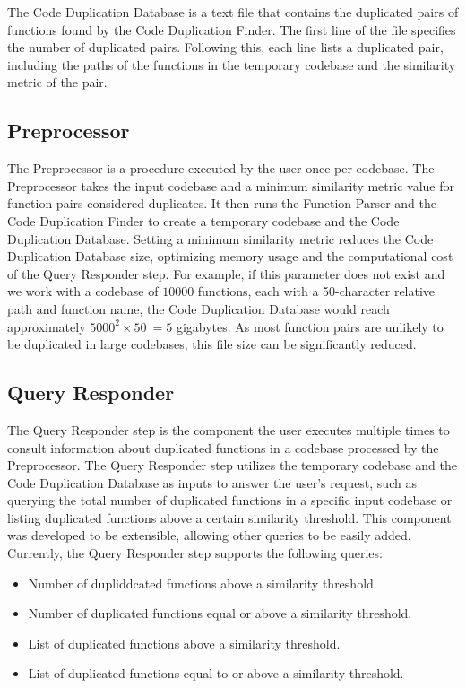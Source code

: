 The Code Duplication Database is a text file that contains the duplicated pairs of functions found by the Code Duplication Finder. The first line of the file specifies the number of duplicated pairs. Following this, each line lists a duplicated pair, including the paths of the functions in the temporary codebase and the similarity metric of the pair.

\subsection{Preprocessor}
\label{subsec:setup}

The Preprocessor is a procedure executed by the user once per codebase. 
The Preprocessor takes the input codebase and a minimum similarity metric value for function pairs considered duplicates. 
It then runs the Function Parser and the Code Duplication Finder to create a temporary codebase and the Code Duplication Database. 
Setting a minimum similarity metric reduces the Code Duplication Database size, optimizing memory usage and the computational 
cost of the Query Responder step. For example, if this parameter does not exist and we work with a codebase of $10000$ functions, 
each with a 50-character relative path and function name, the Code Duplication Database would reach approximately $5000^2 \times 50 ~= 5$ gigabytes. 
As most function pairs are unlikely to be duplicated in large codebases, this file size can be significantly reduced.

\subsection{Query Responder}


The Query Responder step is the component the user executes multiple times to consult information about duplicated functions in a codebase processed by the Preprocessor. The Query Responder step utilizes the temporary codebase and the Code Duplication Database as inputs to answer the user's request, such as querying the total number of duplicated functions in a specific input codebase or listing duplicated functions above a certain similarity threshold. This component was developed to be extensible, allowing other queries to be easily added. Currently, the Query Responder step supports the following queries:

\begin{itemize}
	\item Number of dupliddcated functions above a similarity threshold.
	\item Number of duplicated functions equal or above a similarity threshold.
	\item List of duplicated functions above a similarity threshold.
	\item List of duplicated functions equal to or above a similarity threshold.
\end{itemize}
